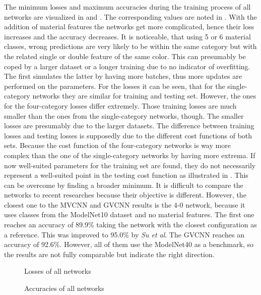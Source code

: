The minimum losses and maximum accuracies during the training process of all networks are visualized in  and .
The corresponding values are noted in .
With the addition of material features the networks get more complicated, hence their loss increases and the accuracy decreases.
It is noticeable, that using 5 or 6 material classes, wrong predictions are very likely to be within the same category but with the related single or double feature of the same color.
This can presumably be coped by a larger dataset or a longer training due to no indicator of overfitting.
The first simulates the latter by having more batches, thus more updates are performed on the parameters.
For the losses it can be seen, that for the single-category networks they are similar for training and testing set.
However, the ones for the four-category losses differ extremely.
Those training losses are much smaller than the ones from the single-category networks, though.
The smaller losses are presumably due to the larger datasets.
The difference between training losses and testing losses is supposedly due to the different cost functions of both sets.
Because the cost function of the four-category networks is way more complex than the one of the single-category networks by having more extrema.
If now well-suited parameters for the training set are found, they do not necessarily represent a well-suited point in the testing cost function as illustrated in .
This can be overcome by finding a broader minimum.
It is difficult to compare the networks to recent researches because their objective is different.
However, the closest one to the MVCNN and GVCNN results is the 4-0 network, because it uses classes from the ModelNet10 dataset and no material features.
The first one reaches an accuracy of 89.9\% taking the network with the closest configuration as a reference.
This was improved to 95.0\% by \textit{Su et al}.
The GVCNN reaches an accuracy of 92.6\%.
However, all of them use the ModelNet40 as a benchmark, so the results are not fully comparable but indicate the right direction.
\begin{figure}
	\setlength{}
	\setlength{}
	\centering
	
	\caption{Losses of all networks}
	\label{fig:losses}
\end{figure}
\begin{figure}
	\setlength{}
	\setlength{}
	\centering
	
	\caption{Accuracies of all networks}
	\label{fig:accuracies}
\end{figure}
